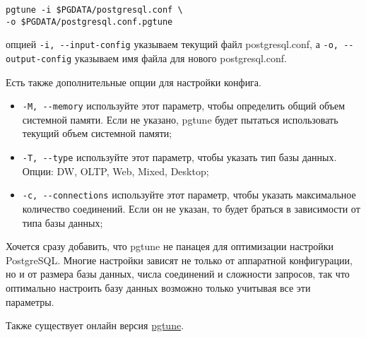 \begin{lstlisting}[label=lst:p_settings1,caption=Pgtune]
pgtune -i $PGDATA/postgresql.conf \
-o $PGDATA/postgresql.conf.pgtune
\end{lstlisting}

опцией \lstinline!-i, --input-config! указываем текущий файл postgresql.conf, а \lstinline!-o, --output-config! указываем имя файла для нового postgresql.conf.

Есть также дополнительные опции для настройки конфига.

\begin{itemize}
  \item \lstinline!-M, --memory! используйте этот параметр, чтобы определить общий объем системной памяти. Если не указано, pgtune будет пытаться использовать текущий объем системной памяти;
  \item \lstinline!-T, --type! используйте этот параметр, чтобы указать тип базы данных. Опции: DW, OLTP, Web, Mixed, Desktop;
  \item \lstinline!-c, --connections! используйте этот параметр, чтобы указать максимальное количество соединений. Если он не указан, то будет браться в зависимости от типа базы данных;
\end{itemize}

Хочется сразу добавить, что pgtune не панацея для оптимизации настройки PostgreSQL. Многие настройки зависят не только от аппаратной конфигурации, но и от размера базы данных, числа соединений и сложности запросов, так что оптимально настроить базу данных возможно только учитывая все эти параметры.

Также существует онлайн версия \href{http://pgtune.leopard.in.ua/}{pgtune}.